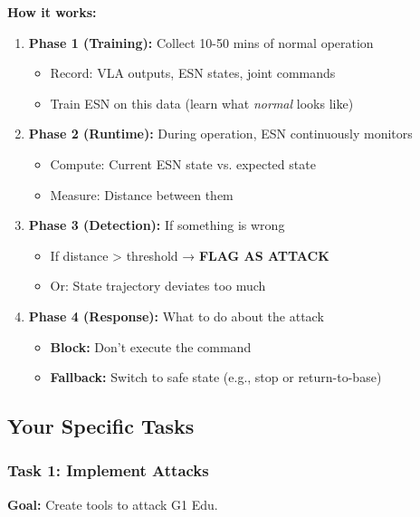 \documentclass[11pt]{article}
\begin{document}
\textbf{How it works:}
\begin{enumerate}
    \item \textbf{Phase 1 (Training):} Collect 10-50 mins of normal operation
    \begin{itemize}
        \item Record: VLA outputs, ESN states, joint commands
        \item Train ESN on this data (learn what \textit{normal} looks like)
    \end{itemize}
    
    \item \textbf{Phase 2 (Runtime):} During operation, ESN continuously monitors
    \begin{itemize}
        \item Compute: Current ESN state vs. expected state
        \item Measure: Distance between them
    \end{itemize}
    
    \item \textbf{Phase 3 (Detection):} If something is wrong
    \begin{itemize}
        \item If distance > threshold → \textbf{FLAG AS ATTACK}
        \item Or: State trajectory deviates too much
    \end{itemize}
    
    \item \textbf{Phase 4 (Response):} What to do about the attack
    \begin{itemize}
        \item \textbf{Block:} Don't execute the command
        \item \textbf{Fallback:} Switch to safe state (e.g., stop or return-to-base)
    \end{itemize}
\end{enumerate}

\subsection{Your Specific Tasks}

\subsubsection{Task 1: Implement Attacks}
\textbf{Goal:} Create tools to attack G1 Edu.
\end{document}
